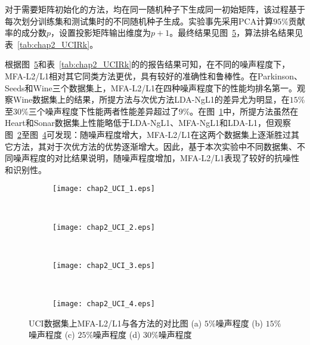 对于需要矩阵初始化的方法，均在同一随机种子下生成同一初始矩阵，该过程基于每次划分训练集和测试集时的不同随机种子生成。实验事先采用PCA计算$95\%$贡献率的成分数$p$，设置投影矩阵输出维度为$p+1$。最终结果见图~\ref{fig:chap2_UCI}，算法排名结果见表~\ref{tab:chap2_UCIRk}。

根据图~\ref{fig:chap2_UCI}和表~\ref{tab:chap2_UCIRk}的的报告结果可知，在不同的噪声程度下，MFA-L2/L1相对其它同类方法更优，具有较好的准确性和鲁棒性。在Parkinson、Seeds和Wine三个数据集上，MFA-L2/L1在四种噪声程度下的性能均排名第一。观察Wine数据集上的结果，所提方法与次优方法LDA-NgL1的差异尤为明显，在$15\%$至$30\%$三个噪声程度下性能两者性能差异超过了$9\%$。在图~\ref{fig:chap2_UCI1}中，所提方法虽然在Heart和Sonar数据集上性能略低于LDA-NgL1、MFA-NgL1和LDA-L1，但观察图~\ref{fig:chap2_UCI2}至图~\ref{fig:chap2_UCI4}可发现：随噪声程度增大，MFA-L2/L1在这两个数据集上逐渐胜过其它方法，其对于次优方法的优势逐渐增大。因此，基于本次实验中不同数据集、不同噪声程度的对比结果说明，随噪声程度增加，MFA-L2/L1表现了较好的抗噪性和识别性。

\begin{figure}[!htbp]
\centering
    \begin{subfigure}[b]{0.49\textwidth}
      \texttt{[image: chap2\_UCI\_1.eps]}
      \caption{}
      \label{fig:chap2_UCI1}
    \end{subfigure}%
    ~%
    \begin{subfigure}[b]{0.49\textwidth}
      \texttt{[image: chap2\_UCI\_2.eps]}
      \caption{}
      \label{fig:chap2_UCI2}
    \end{subfigure}%
    \\ \vspace{2mm}%

    \begin{subfigure}[b]{0.49\textwidth}
      \texttt{[image: chap2\_UCI\_3.eps]}
      \caption{}
      \label{fig:chap2_UCI3}
    \end{subfigure}%
    ~%
    \begin{subfigure}[b]{0.49\textwidth}
      \texttt{[image: chap2\_UCI\_4.eps]}
      \caption{}
      \label{fig:chap2_UCI4}
    \end{subfigure}%
    \caption{UCI数据集上MFA-L2/L1与各方法的对比图 (a) $5\%$噪声程度 (b) $15\%$噪声程度 (c) $25\%$噪声程度 (d) $30\%$噪声程度}
    \label{fig:chap2_UCI}
\end{figure}

